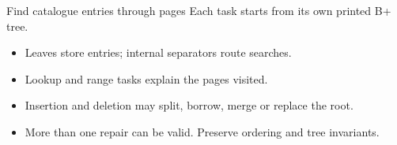 \begin{frame}[t]{Find catalogue entries through pages}
Each task starts from its own printed B+ tree.
\medskip
\begin{itemize}
\item Leaves store entries; internal separators route searches.
\item Lookup and range tasks explain the pages visited.
\item Insertion and deletion may split, borrow, merge or replace the root.
\item More than one repair can be valid. Preserve ordering and tree invariants.
\end{itemize}
\end{frame}
